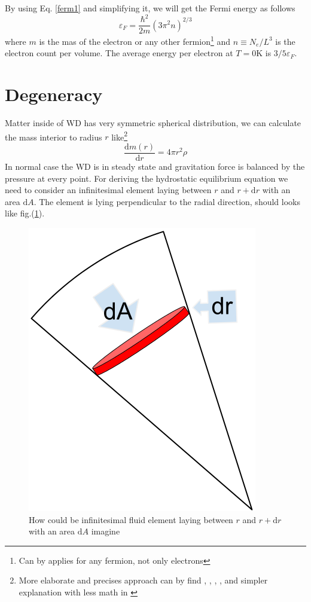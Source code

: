\documentclass[oneside,a4paper,11pt]{report}
\begin{document}
By using Eq. \eqref{ferm1} and simplifying it, we will get the Fermi energy as follows
\begin{equation}
\varepsilon_F = \frac{\hbar^2}{2m}\left ( 3\pi^2n \right )^{2/3}
\end{equation}
where $m$ is the mas of the electron or any other fermion\footnote{Can by applies for any fermion, not only electrons} 
and $n\equiv N_e/L^3$ is the electron count per volume. 
The average energy per electron at $T = 0\mathrm{K}$ is $3/5\varepsilon_F$.    
  
\section{Degeneracy}
Matter inside of WD has very symmetric spherical distribution, we can calculate the mass interior to radius $r$ like\footnote{More elaborate and precises approach can by find 
\citet{2004bhwd.book.....S}, \cite{padm_vII}, \citet{kleczek}, \citet{comp_obj1}, \citet{1972ApJ...175..417N} and simpler explanation with
less math in \citet{2007ima..book.....C}}
\begin{equation}
 \frac{\mathrm{d}m(r)}{\mathrm{d}r} = 4 \pi r^2 \rho
\end{equation}
In normal case the WD is in steady state and gravitation force is balanced by the pressure at every point.  
For deriving the hydrostatic equilibrium equation we need to consider an infinitesimal element laying between 
$r$ and $r+\mathrm{d}r$ with an area $\mathrm{d}A$. The element is lying perpendicular to the radial direction, should looks like fig.(\ref{wd1}).
\begin{figure}[!hbt]
\centering
\includegraphics[totalheight=4cm]{plot/wd1}
\caption{How could be infinitesimal fluid element laying between 
$r$ and $r+\mathrm{d}r$ with an area $\mathrm{d}A$ imagine}
\label{wd1} 
\end{figure}
\end{document}
